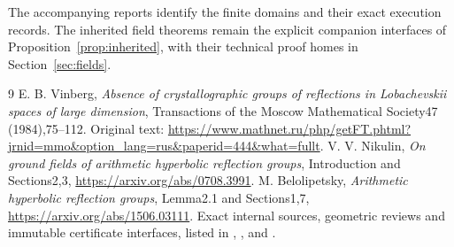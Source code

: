\documentclass[11pt]{article}
\begin{document}
The accompanying reports identify the finite domains and their exact
execution records. The inherited field theorems remain the explicit companion
interfaces of Proposition~\ref{prop:inherited}, with their technical
proof homes in Section~\ref{sec:fields}.

\begin{thebibliography}{9}
 E. B. Vinberg, \emph{Absence of crystallographic groups
of reflections in Lobachevskii spaces of large dimension}, Transactions
of the Moscow Mathematical Society47 (1984),75--112. Original text:
\url{https://www.mathnet.ru/php/getFT.phtml?jrnid=mmo&option_lang=rus&paperid=444&what=fullt}.
 V. V. Nikulin, \emph{On ground fields of arithmetic
hyperbolic reflection groups}, Introduction and Sections2,3,
\url{https://arxiv.org/abs/0708.3991}.
 M. Belolipetsky, \emph{Arithmetic hyperbolic
reflection groups}, Lemma2.1 and Sections1,7,
\url{https://arxiv.org/abs/1506.03111}.
 Exact internal sources, geometric reviews and immutable
certificate interfaces, listed in
,
,
and .
\end{thebibliography}
\end{document}

